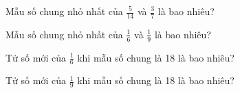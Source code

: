\begin{ex}
Mẫu số chung nhỏ nhất của $\frac{5}{14}$ và $\frac{3}{7}$ là bao nhiêu?
\end{ex}

\begin{ex}
Mẫu số chung nhỏ nhất của $\frac{1}{6}$ và $\frac{1}{9}$ là bao nhiêu?
\end{ex}

\begin{ex}
Tử số mới của $\frac{1}{6}$ khi mẫu số chung là 18 là bao nhiêu?
\end{ex}

\begin{ex}
Tử số mới của $\frac{1}{9}$ khi mẫu số chung là 18 là bao nhiêu?
\end{ex}
